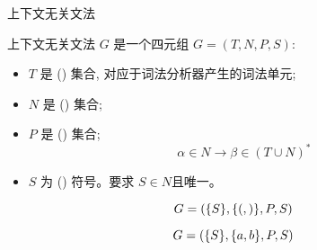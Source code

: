 
\begin{frame}{}

  \begin{center}
    上下文无关文法
  \end{center}
\end{frame}

\begin{frame}{}
  \begin{definition}
    上下文无关文法 $G$ 是一个四元组 $G = (T, N, P, S)$:
    \vspace{0.30cm}

    \begin{itemize}
      \setlength{\itemsep}{8pt}
      \item $T$ 是 () 集合, 对应于词法分析器产生的词法单元;
      \item $N$ 是 () 集合;
      \item $P$ 是 () 集合;
        \[
          \boxed{\alpha \in N \longrightarrow \beta \in (T \cup N)^{\ast}}
        \]
        \vspace{-0.60cm}
      \item $S$ 为 () 符号。要求 $S \in N$且唯一。
    \end{itemize}
  \end{definition}
\end{frame}

\begin{frame}{}
  \[
    G = (\{S\}, \{(,)\}, P, S)
  \]

\end{frame}

\begin{frame}{}
  \[
    G = (\{S\}, \{a,b\}, P, S)
  \]

\end{frame}

